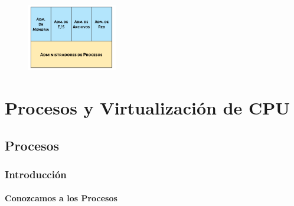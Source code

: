 \documentclass[12pt, fleqn]{report}                             %
\begin{document}
            \begin{figure}[h!]
                \centering
                \includegraphics[width=0.35\textwidth]{PartesDelKernel}
            \end{figure}





\part{Procesos y Virtualización de CPU}
\clearpage


    \chapter{Procesos}

        \clearpage
        \section{Introducción}

            \subsection{Conozcamos a los Procesos}
\end{document}
